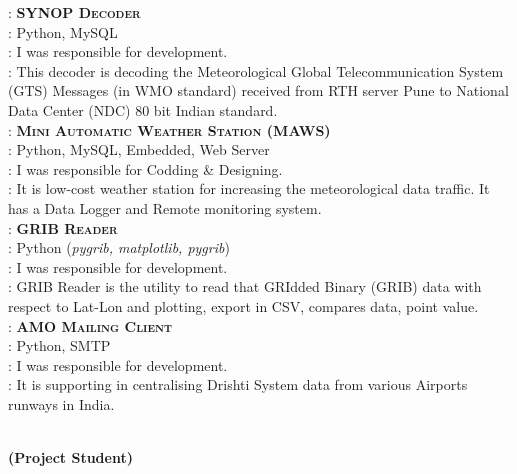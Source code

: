\documentclass[a4paper,11pt]{memoir} %
\begin{document}
\begin{minipage}[t]{0.80\columnwidth}
: \textbf{\textsc{SYNOP Decoder}}\\
: Python, MySQL\\
: I was responsible for development.\\
: This decoder is decoding the Meteorological Global Telecommunication System (GTS) 
Messages (in WMO standard) received from RTH server Pune to National Data Center (NDC) 80 bit Indian standard. \\

: \textbf{\textsc{Mini Automatic Weather Station} (MAWS)}\\
: Python, MySQL, Embedded, Web Server \\
: I was responsible for Codding \& Designing.\\
: It is low-cost weather station for increasing the meteorological data traffic. 
It has a Data Logger and Remote monitoring system.\\

: \textbf{\textsc{GRIB Reader}}\\
: Python (\textit{pygrib, matplotlib, pygrib})\\
: I was responsible for development.\\
: GRIB Reader is the utility to read that GRIdded Binary (GRIB) data with respect to Lat-Lon and plotting, export in CSV, compares data, point value.\\

: \textbf{\textsc{AMO Mailing Client}}\\
: Python, SMTP\\
: I was responsible for development.\\
: It is supporting in centralising Drishti System data from various Airports runways in India.

\end{minipage}



\clearpage %
\userinformation %
\framebreak %



\begin{minipage}[t]{0.20\columnwidth}
\end{minipage}
\hfill
\begin{minipage}[t]{0.80\columnwidth}
\begin{center}
\\
\textbf{(Project Student)}
\end{center}
\end{minipage}
\Sep
\end{document}
